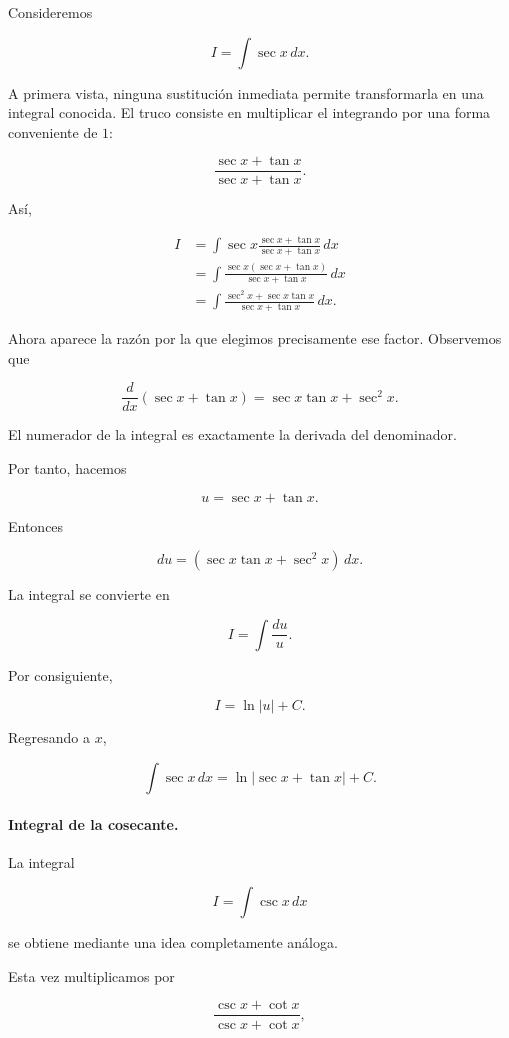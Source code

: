 \documentclass[12pt]{article}
\theoremstyle{definition}
\theoremstyle{remark}
\begin{document}
Consideremos

\[
I=\int\sec x\,dx.
\]

A primera vista, ninguna sustitución inmediata permite transformarla
en una integral conocida. El truco consiste en multiplicar el
integrando por una forma conveniente de \(1\):

\[
\frac{\sec x+\tan x}{\sec x+\tan x}.
\]

Así,

\begin{align*}
I
&=
\int
\sec x
\frac{\sec x+\tan x}
     {\sec x+\tan x}\,dx\\[2mm]
&=
\int
\frac{\sec x(\sec x+\tan x)}
     {\sec x+\tan x}\,dx\\[2mm]
&=
\int
\frac{\sec^2x+\sec x\tan x}
     {\sec x+\tan x}\,dx.
\end{align*}

Ahora aparece la razón por la que elegimos precisamente ese factor.
Observemos que

\[
\frac{d}{dx}(\sec x+\tan x)
=
\sec x\tan x+\sec^2x.
\]

El numerador de la integral es exactamente la derivada del
denominador.

Por tanto, hacemos

\[
u=\sec x+\tan x.
\]

Entonces

\[
du
=
\left(
\sec x\tan x+\sec^2x
\right)\,dx.
\]

La integral se convierte en

\[
I=\int\frac{du}{u}.
\]

Por consiguiente,

\[
I=\ln|u|+C.
\]

Regresando a \(x\),

\[
\boxed{
\int\sec x\,dx
=
\ln|\sec x+\tan x|+C.
}
\]

\paragraph{Integral de la cosecante.}

La integral

\[
I=\int\csc x\,dx
\]

se obtiene mediante una idea completamente análoga.

Esta vez multiplicamos por

\[
\frac{\csc x+\cot x}
     {\csc x+\cot x},
\]
\end{document}
